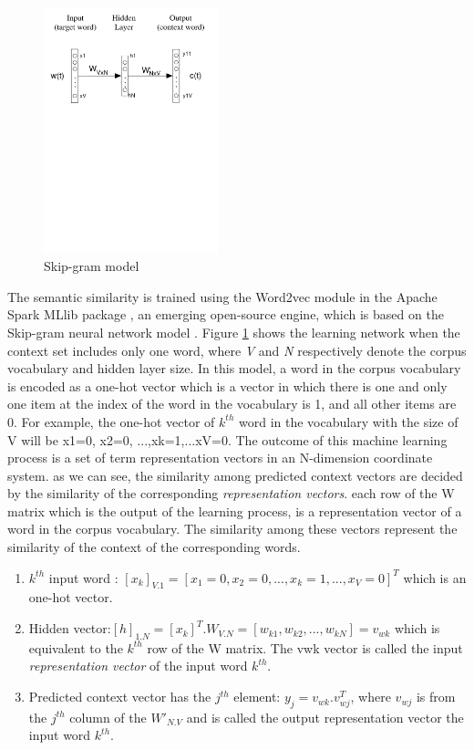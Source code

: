\documentclass[Journal, BackFigs, DoubleSpace]{ascelike} %
\begin{document}
\begin{figure}[t]
	\centering
	\includegraphics[width=0.45\textwidth]{Figure4_skip-gram-model}
	\caption{Skip-gram model}
	\label{fig:skip-gram}
\end{figure}
%
The semantic similarity is trained using the Word2vec module in the Apache Spark MLlib package \cite{apache16}, an emerging open-source engine, which is based on the Skip-gram neural network model \cite{mikolov13a}. Figure \ref{fig:skip-gram} shows the learning network when the context set includes only one word, where \textit{V} and \textit{N} respectively denote the corpus vocabulary and hidden layer size. In this model, a word in the corpus vocabulary is encoded as a one-hot vector which is a vector in which there is one and only one item at the index of the word in the vocabulary is 1, and all other items are 0. For example, the one-hot vector of $k^{th}$ word in the vocabulary with the size of V will be {x1=0, x2=0, ...,xk=1,...xV=0}. The outcome of this machine learning process is a set of term representation vectors  in an N-dimension coordinate system. as we can see, the similarity among predicted context vectors are decided by the similarity of the corresponding \textit{representation vectors}. each row of the W matrix which is the output of the learning process, is a representation vector of a word in the corpus vocabulary. The similarity among these vectors represent the similarity of the context of the corresponding words. 
%
\begin{enumerate}
	\item $k^{th}$ input word : $[x_k]_{V.1} = [x_1=0, x_2=0,...,x_k=1,..., x_V=0]^T$ which is an one-hot vector.
	\item Hidden vector:$[h]_{1.N} = [x_k]^T.W_{V.N} = [w_{k1},w_{k2},..., w_{kN}]= v_{wk}$ which is equivalent to the $k^{th}$ row of the W matrix. The vwk vector is called the  input \textit{representation vector} of the input word $k^{th}$.
	\item Predicted context vector has the $j^{th}$ element: $y_j = v_{wk}.v^T_{wj}$, where $v_{wj}$ is from the $j^{th}$ column of the $W'_{N.V}$ and is called the output representation vector the input word $k^{th}$. 
\end{enumerate}
\end{document}
